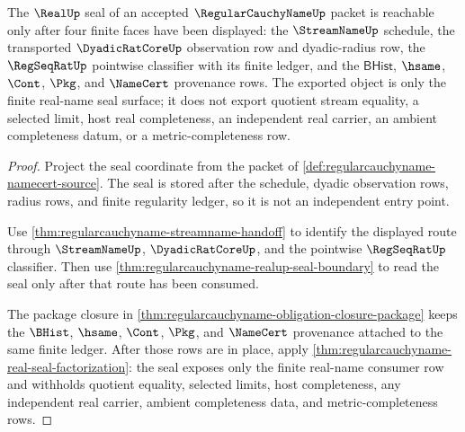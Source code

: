 \begin{theorem}
\label{thm:regularcauchyname-real-seal-consumer-scope}
The $\RealUp$ seal of an accepted $\RegularCauchyNameUp$ packet is reachable only after four finite faces have been displayed: the $\StreamNameUp$ schedule, the transported $\DyadicRatCoreUp$ observation row and dyadic-radius row, the $\RegSeqRatUp$ pointwise classifier with its finite ledger, and the $\mathsf{BHist}$, $\hsame$, $\Cont$, $\Pkg$, and $\NameCert$ provenance rows. The exported object is only the finite real-name seal surface; it does not export quotient stream equality, a selected limit, host real completeness, an independent real carrier, an ambient completeness datum, or a metric-completeness row.
\end{theorem}
\begin{proof}
Project the seal coordinate from the packet of \autoref{def:regularcauchyname-namecert-source}. The seal is stored after the schedule, dyadic observation rows, radius rows, and finite regularity ledger, so it is not an independent entry point.

Use \autoref{thm:regularcauchyname-streamname-handoff} to identify the displayed route through $\StreamNameUp$, $\DyadicRatCoreUp$, and the pointwise $\RegSeqRatUp$ classifier. Then use \autoref{thm:regularcauchyname-realup-seal-boundary} to read the seal only after that route has been consumed.

The package closure in \autoref{thm:regularcauchyname-obligation-closure-package} keeps the $\BHist$, $\hsame$, $\Cont$, $\Pkg$, and $\NameCert$ provenance attached to the same finite ledger. After those rows are in place, apply \autoref{thm:regularcauchyname-real-seal-factorization}: the seal exposes only the finite real-name consumer row and withholds quotient equality, selected limits, host completeness, any independent real carrier, ambient completeness data, and metric-completeness rows.
\end{proof}

